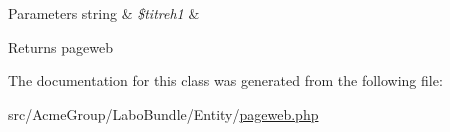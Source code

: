 \begin{DoxyParams}[1]{Parameters}
string & {\em \$titreh1} & \\
\hline
\end{DoxyParams}
\begin{DoxyReturn}{Returns}
pageweb 
\end{DoxyReturn}


The documentation for this class was generated from the following file\+:\begin{DoxyCompactItemize}
\item 
src/\+Acme\+Group/\+Labo\+Bundle/\+Entity/\hyperlink{_labo_bundle_2_entity_2pageweb_8php}{pageweb.\+php}\end{DoxyCompactItemize}
